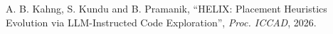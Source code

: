 A. B. Kahng, S. Kundu and B. Pramanik,
``HELIX: Placement Heuristics Evolution via LLM-Instructed Code Exploration'',
{\em Proc. ICCAD}, 2026.
